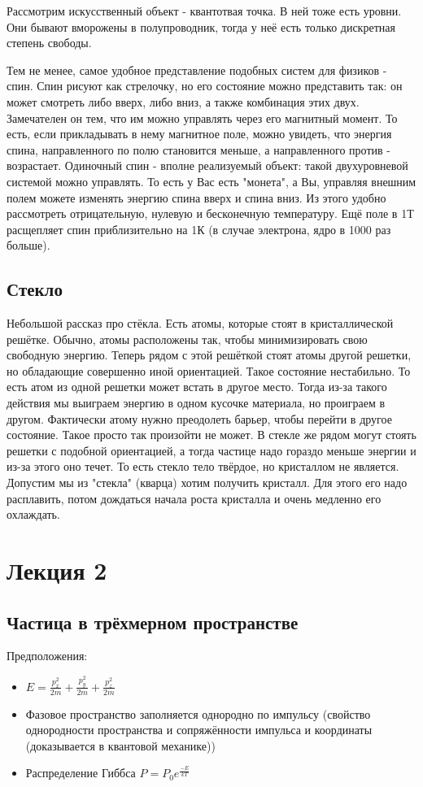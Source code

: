 \documentclass[a4paper, 12pt]{article}
\begin{document}
	Рассмотрим искусственный объект - квантотвая точка. В ней тоже есть уровни. Они бывают вморожены в полупроводник, тогда у неё есть только дискретная степень свободы.
	
	Тем не менее, самое удобное представление подобных систем для физиков - спин. Спин рисуют как стрелочку, но его состояние можно представить так: он может смотреть либо вверх, либо вниз, а также комбинация этих двух. Замечателен он тем, что им можно управлять через его магнитный момент. То есть, если прикладывать в нему магнитное поле, можно увидеть, что энергия спина, направленного по полю становится меньше, а направленного против - возрастает. Одиночный спин - вполне реализуемый объект: такой двухуровневой системой можно управлять. То есть у Вас есть "монета", а Вы, управляя внешним полем можете изменять энергию спина вверх и спина вниз. Из этого удобно рассмотреть отрицательную, нулевую и бесконечную температуру. Ещё поле в 1Т расщепляет спин приблизительно на 1К (в случае электрона, ядро в 1000 раз больше).
	\subsection{Стекло}
	Небольшой рассказ про стёкла. Есть атомы, которые стоят в кристаллической решётке. Обычно, атомы расположены так, чтобы минимизировать свою свободную энергию. Теперь рядом с этой решёткой стоят атомы другой решетки, но обладающие совершенно иной ориентацией. Такое состояние нестабильно. То есть атом из одной решетки может встать в другое место. Тогда из-за такого действия мы выиграем энергию в одном кусочке материала, но проиграем в другом. Фактически атому нужно преодолеть барьер, чтобы перейти в другое состояние. Такое просто так произойти не может. В стекле же рядом могут стоять решетки с подобной ориентацией, а тогда частице надо гораздо меньше энергии и из-за этого оно течет. То есть стекло тело твёрдое, но кристаллом не является. Допустим мы из "стекла" (кварца) хотим получить кристалл. Для этого его надо расплавить, потом дождаться начала роста кристалла и очень медленно его охлаждать.
	
	\section{Лекция 2}
	\subsection{Частица в трёхмерном пространстве}
	Предположения:
	\begin{itemize}
		\item $E = \frac{p_{x}^2}{2m}+\frac{p_{y}^2}{2m}+\frac{p_{z}^2}{2m}$
		\item Фазовое пространство заполняется однородно по импульсу (свойство однородности пространства и сопряжённости импульса и координаты (доказывается в квантовой механике))
		\item  Распределение Гиббса $P = P_{0} e^{\frac{-E}{kT}}$
	\end{itemize}
	
\end{document}
